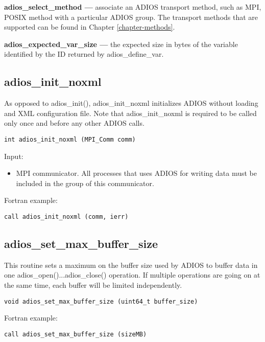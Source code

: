 \textbf{adios\_select\_method ---} associate an ADIOS transport method, such as MPI, 
POSIX method with a particular ADIOS group. The transport methods that are supported 
can be found in Chapter \ref{chapter-methods}.

\textbf{adios\_expected\_var\_size ---} the expected size in bytes of the variable identified by the ID returned by adios\_define\_var.


\subsection{adios\_init\_noxml}

As opposed to adios\_init(), adios\_init\_noxml initializes ADIOS without loading
and XML configuration file. Note that adios\_init\_noxml is required to be called only 
once and before any other ADIOS calls. 

\begin{lstlisting}[alsolanguage=C,caption={},label={}]
int adios_init_noxml (MPI_Comm comm)
\end{lstlisting}

Input: 
\begin{itemize}
\item MPI communicator. All processes that uses ADIOS for writing data must be included in the group of this communicator.
\end{itemize}

Fortran example: 
\begin{lstlisting}[alsolanguage=Fortran,caption={},label={}]
call adios_init_noxml (comm, ierr)
\end{lstlisting}

\subsection{adios\_set\_max\_buffer\_size}
This routine sets a maximum on the buffer size used by ADIOS to buffer data in one adios\_open()...adios\_close() operation.
If multiple operations are going on at the same time, each buffer will be limited independently.

\begin{lstlisting}[alsolanguage=C,caption={},label={}]
void adios_set_max_buffer_size (uint64_t buffer_size)
\end{lstlisting}

Fortran example:
\begin{lstlisting}[alsolanguage=Fortran,caption={},label={}]
call adios_set_max_buffer_size (sizeMB)
\end{lstlisting}


